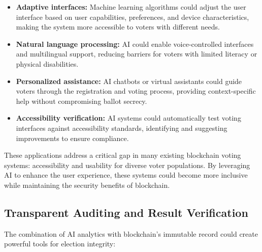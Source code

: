 \documentclass[conference]{IEEEtran}
\begin{document}
\begin{itemize}
    \item \textbf{Adaptive interfaces:} Machine learning algorithms could adjust the user interface based on user capabilities, preferences, and device characteristics, making the system more accessible to voters with different needs.
    
    \item \textbf{Natural language processing:} AI could enable voice-controlled interfaces and multilingual support, reducing barriers for voters with limited literacy or physical disabilities.
    
    \item \textbf{Personalized assistance:} AI chatbots or virtual assistants could guide voters through the registration and voting process, providing context-specific help without compromising ballot secrecy.
    
    \item \textbf{Accessibility verification:} AI systems could automatically test voting interfaces against accessibility standards, identifying and suggesting improvements to ensure compliance.
\end{itemize}

These applications address a critical gap in many existing blockchain voting systems: accessibility and usability for diverse voter populations. By leveraging AI to enhance the user experience, these systems could become more inclusive while maintaining the security benefits of blockchain.

\subsection{Transparent Auditing and Result Verification}
The combination of AI analytics with blockchain's immutable record could create powerful tools for election integrity:
\end{document}
